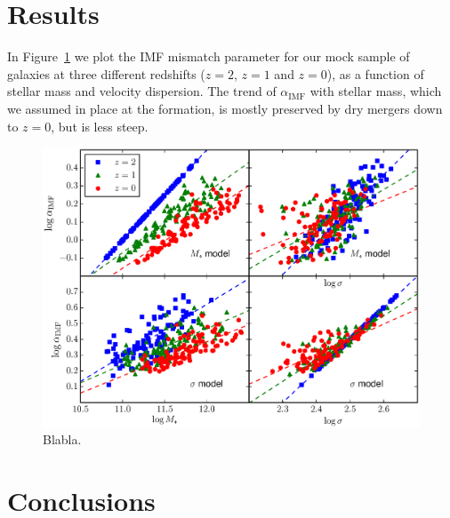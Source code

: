 \documentclass[usenatbib, letters]{mnras}
\def\aimf{\alpha_{\mathrm{IMF}}}
\def\Fref#1{Figure~\ref{#1}\xspace}
\begin{document}
\section{Results}\label{sect:results}

In \Fref{fig:snap} we plot the IMF mismatch parameter for our mock sample of galaxies at three different redshifts ($z=2$, $z=1$ and $z=0$), as a function of stellar mass and velocity dispersion.
The trend of $\aimf$ with stellar mass, which we assumed in place at the formation, is mostly preserved by dry mergers down to $z=0$, but is less steep.
%
\begin{figure}
 \includegraphics[width=\textwidth]{snapshots.eps}
 \caption{ Blabla.}
 \label{fig:snap}
\end{figure}






\section{Conclusions}\label{sect:concl} 
\end{document}

